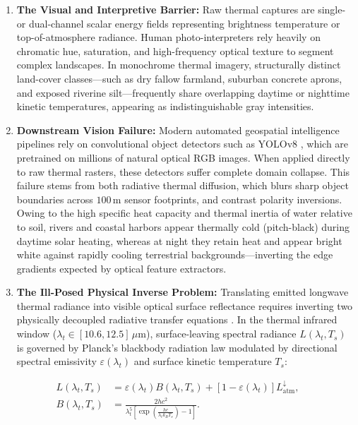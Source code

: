 \documentclass[10pt,a4paper,twoside]{article}
\begin{document}
\begin{enumerate}
    \item \textbf{The Visual and Interpretive Barrier:} Raw thermal captures are single- or dual-channel scalar energy fields representing brightness temperature or top-of-atmosphere radiance. Human photo-interpreters rely heavily on chromatic hue, saturation, and high-frequency optical texture to segment complex landscapes. In monochrome thermal imagery, structurally distinct land-cover classes---such as dry fallow farmland, suburban concrete aprons, and exposed riverine silt---frequently share overlapping daytime or nighttime kinetic temperatures, appearing as indistinguishable gray intensities.
    \item \textbf{Downstream Vision Failure:} Modern automated geospatial intelligence pipelines rely on convolutional object detectors such as YOLOv8 \cite{ref4}, which are pretrained on millions of natural optical RGB images. When applied directly to raw thermal rasters, these detectors suffer complete domain collapse. This failure stems from both radiative thermal diffusion, which blurs sharp object boundaries across $100\,\text{m}$ sensor footprints, and contrast polarity inversions. Owing to the high specific heat capacity and thermal inertia of water relative to soil, rivers and coastal harbors appear thermally cold (pitch-black) during daytime solar heating, whereas at night they retain heat and appear bright white against rapidly cooling terrestrial backgrounds---inverting the edge gradients expected by optical feature extractors.
    \item \textbf{The Ill-Posed Physical Inverse Problem:} Translating emitted longwave thermal radiance into visible optical surface reflectance requires inverting two physically decoupled radiative transfer equations \cite{ref5}. In the thermal infrared window ($\lambda_t \in [10.6, 12.5]\,\mu\text{m}$), surface-leaving spectral radiance $L(\lambda_t, T_s)$ is governed by Planck's blackbody radiation law modulated by directional spectral emissivity $\varepsilon(\lambda_t)$ and surface kinetic temperature $T_s$:
\end{enumerate}

\begin{equation}
    \begin{aligned}
        L(\lambda_t,T_s)
        &= \varepsilon(\lambda_t)B(\lambda_t,T_s)
        + [1-\varepsilon(\lambda_t)]L_{\mathrm{atm}}^{\downarrow},\\
        B(\lambda_t,T_s)
        &= \frac{2hc^2}{\lambda_t^5\left[\exp\!\left(\frac{hc}{\lambda_t k_B T_s}\right)-1\right]}.
    \end{aligned}
    \label{eq:planck}
\end{equation}
\end{document}
